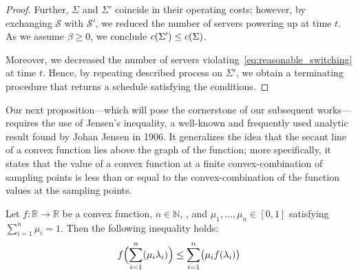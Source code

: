 \begin{proof}
Further, $\Sigma$ and $\Sigma'$ coincide in their operating costs; however, by exchanging $\mathcal{S}$ with $\mathcal{S}'$, we reduced the number of servers powering up at time $t$. As we assume $\beta\ge0$, we conclude $c(\Sigma')\le c(\Sigma)$.

Moreover, we decreased the number of servers violating~\eqref{eq:reasonable_switching} at time $t$. Hence, by repeating described process on $\Sigma'$, we obtain a terminating procedure that returns a schedule satisfying the conditions.
\end{proof}

Our next proposition---which will pose the cornerstone of our subsequent works---requires the use of Jensen's inequality, a well-known and frequently used analytic result found by Johan Jensen in 1906. It generalizes the idea that the secant line of a convex function lies above the graph of the function; more specifically, it states that the value of a convex function at a finite convex-combination of sampling points is less than or equal to the convex-combination of the function values at the sampling points.
\begin{lem}\label{lem:jensens-inequality}
Let $f:\mathbb{R}\rightarrow\mathbb{R}$ be a convex function, $n\in\mathbb{N}$, , and $\mu_1,\dotsc,\mu_n\in[0,1]$ satisfying $\sum\limits_{i=1}^{n}\mu_i=1$. Then the following inequality holds:
\begin{equation*}
	f\Bigl(\sum_{i=1}^n(\mu_i \lambda_i)\Bigr) \le \sum_{i=1}^n\bigl(\mu_i f(\lambda_i)\bigr)
\end{equation*}
\end{lem}
